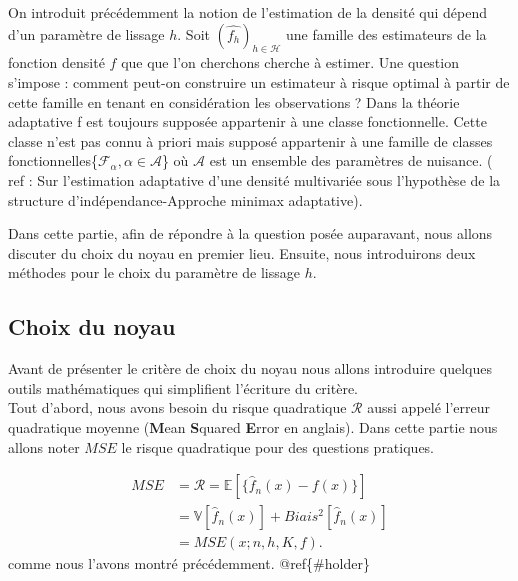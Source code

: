 \documentclass[
]{book}
\begin{document}
\hspace*{0.5cm} On introduit précédemment la notion de l'estimation de la densité qui dépend d'un paramètre de lissage \(h\). Soit \((\hat{f_h})_{h\in \mathcal H}\) une famille des estimateurs de la fonction densité \(f\) que que l'on cherchons cherche à estimer.\newline
Une question s'impose : comment peut-on construire un estimateur à risque optimal à partir de cette famille en tenant en considération les observations ? \newline
Dans la théorie adaptative f est toujours supposée appartenir à une classe fonctionnelle. Cette classe n'est pas connu à priori mais supposé appartenir à une famille de classes fonctionnelles\{\(\mathcal{F_{\alpha}},\alpha \in\mathcal{A}\)\} où \(\mathcal{A}\) est un ensemble des paramètres de nuisance. ( ref : Sur l'estimation adaptative d'une densité multivariée sous l'hypothèse de la structure d'indépendance-Approche minimax adaptative).\newline

\hspace*{0.5cm} Dans cette partie, afin de répondre à la question posée auparavant, nous allons discuter du choix du noyau en premier lieu. Ensuite, nous introduirons deux méthodes pour le choix du paramètre de lissage \(h\).

\hypertarget{choix-du-noyau}{%
\subsection{Choix du noyau}\label{choix-du-noyau}}

\hspace*{0.5cm} Avant de présenter le critère de choix du noyau nous allons introduire quelques outils mathématiques qui simplifient l'écriture du critère.\\
Tout d'abord, nous avons besoin du risque quadratique \(\mathcal R\) aussi appelé l'erreur quadratique moyenne (\textbf{M}ean \textbf{S}quared \textbf{E}rror en anglais). Dans cette partie nous allons noter \(MSE\) le risque quadratique pour des questions pratiques.

\[
\begin{aligned}
MSE &= \mathcal R = \mathbb E \left[ \{  \hat f_n(x)-f(x) \} \right] \\
&=\mathbb V \left[ \hat f_n(x) \right] + Biais^2 \left[ \hat f_n(x) \right] \\
&= MSE(x ; n, h, K, f).
\end{aligned}
\]
comme nous l'avons montré précédemment. @ref\{\#holder\}
\end{document}
